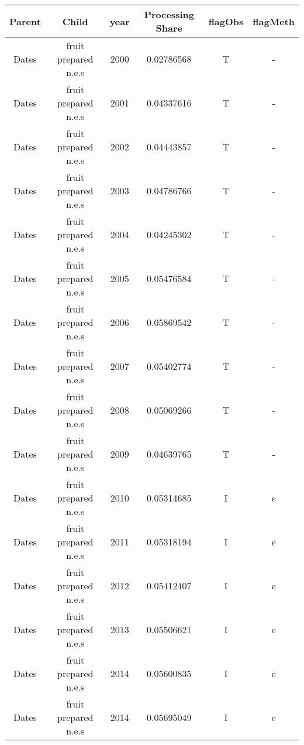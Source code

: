 \documentclass[nojss]{jss}
\begin{document}
  \begin{tabular}{cccccc}
    \hline
    Parent       &Child                     &year      &Processing Share       & flagObs & flagMeth \\
    \hline
    Dates         & fruit prepared n.e.s     &   2000   &     0.02786568        & T & - \\  
    Dates         & fruit prepared n.e.s     &   2001   &     0.04337616        & T & - \\  
    Dates         & fruit prepared n.e.s     &   2002   &     0.04443857        & T & - \\  
    Dates         & fruit prepared n.e.s     &   2003   &     0.04786766        & T & - \\  
    Dates         & fruit prepared n.e.s     &   2004   &     0.04245302        & T & - \\  
    Dates         & fruit prepared n.e.s     &   2005   &     0.05476584        & T & - \\  
    Dates         & fruit prepared n.e.s     &   2006   &     0.05869542        & T & - \\  
    Dates         & fruit prepared n.e.s     &   2007   &     0.05402774        & T & - \\  
    Dates         & fruit prepared n.e.s     &   2008   &     0.05069266        & T & - \\  
    Dates         & fruit prepared n.e.s     &   2009   &     0.04639765        & T & - \\  
    Dates         & fruit prepared n.e.s     &   2010   &     0.05314685        & I & e \\  
    Dates         & fruit prepared n.e.s     &   2011   &     0.05318194        & I & e \\  
    Dates         & fruit prepared n.e.s     &   2012   &     0.05412407        & I & e \\  
    Dates         & fruit prepared n.e.s     &   2013   &     0.05506621        & I & e \\  
    Dates         & fruit prepared n.e.s     &   2014   &     0.05600835        & I & e \\  
    Dates         & fruit prepared n.e.s     &   2014   &     0.05695049        & I & e \\  
    
  
    \hline
  \end{tabular}
  
 
 
 
\end{document}
